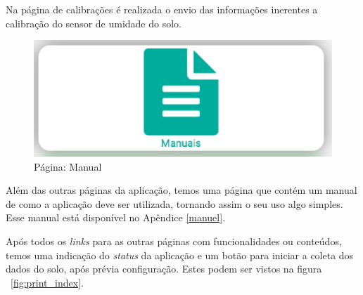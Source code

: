 	Na página de calibrações é realizada o envio das informações inerentes a calibração
	do sensor de umidade do solo.

	\begin{figure}[!htbp]
  \begin{center}
  \includegraphics[width=.7\textwidth]{figuras/manual.eps}
  \caption{\label{fig:print_manual}Página: Manual}
  \end{center}
  \end{figure}

	Além das outras páginas da aplicação, temos uma página que contém um manual de como a aplicação
	deve ser utilizada, tornando assim o seu uso algo simples. Esse manual está disponível no Apêndice \ref{manuel}.

	Após todos os \textit{links} para as outras páginas com funcionalidades ou conteúdos, temos uma indicação
	do \textit{status} da aplicação e um botão para iniciar a coleta dos dados do solo, após prévia configuração. Estes
	podem ser vistos na figura ~\ref{fig:print_index}.

  \newpage

